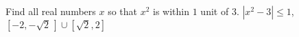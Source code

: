 {Find all real numbers $x$ so that $x^2$ is within $1$ unit of $3$.}
{$|x^2-3| \leq 1$, $[-2, -\sqrt{2} \,] \cup [\sqrt{2}, 2]$ }
